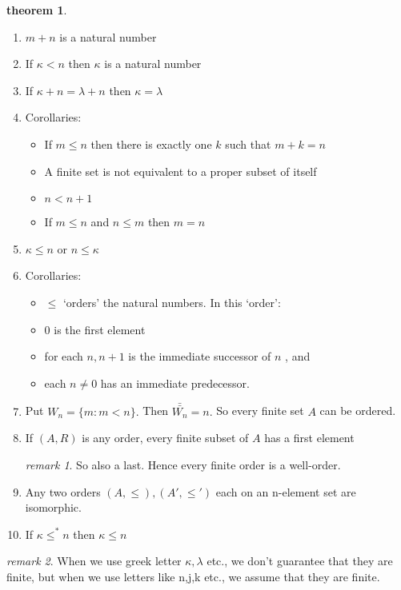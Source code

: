 \documentclass[a4paper,11pt]{article}%
\theoremstyle{remark}
\newtheorem*{remark}{remark}
\theoremstyle{definition}
\newtheorem{theorem}{theorem}[section]
\theoremstyle{definition}
\theoremstyle{plain}
\theoremstyle{definition}
\begin{document}
\begin{theorem}
    \begin{enumerate}
        \item $m+n$ is a natural number
        \item If $\kappa<n$ then $\kappa$ is a natural number
        \item If $\kappa+n=\lambda+n$ then $\kappa=\lambda$
        \item Corollaries:\begin{itemize}
            \item If $m\leq n$ then there is exactly one $k$ such that $m+k=n$
            \item A finite set is not equivalent to a proper subset of itself
            \item $n<n+1$
            \item If $m\leq n$ and $n\leq m$ then $m=n$
        \end{itemize}
        \item $\kappa\leq n$ or $n\leq \kappa$
        \item Corollaries:\begin{itemize}
            \item $\leq$ `orders' the natural numbers. In this `order':
            \item 0 is the first element
            \item for each $n,n+1$ is the immediate successor of $n$ , and
            \item each $n\neq 0$ has an immediate predecessor.
        \end{itemize}
        \item Put $W_n=\{m:m<n\}.$ Then $\bar{\bar{W_n}}=n.$ So every finite set $A$ can be ordered.
        \item If $(A,R)$ is any order, every finite subset of $A$ has a first element\begin{remark}
            So also a last. Hence every finite order is a well-order.
        \end{remark}
        \item Any two orders $(A,\leq),(A',\leq')$ each on an n-element set are isomorphic.
        \item If $\kappa\leq^*n$ then $\kappa\leq n$
    \end{enumerate}
\end{theorem}
\begin{remark}
    When we use greek letter $\kappa,\lambda$ etc., we don't guarantee that they are 
    finite, but when we use letters like n,j,k etc., we assume that they are finite.
\end{remark}
\end{document}
